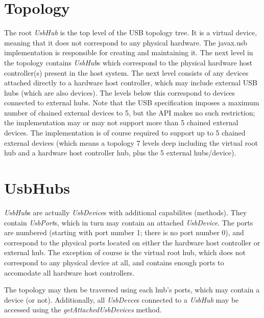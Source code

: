 \documentclass{article}
\newcommand{\myinterface}[1]{\emph{#1}}
\newcommand{\mymethod}[1]{\emph{#1}}
\newcommand{\mysectionend}[0]{\vfill\pagebreak[1]}
\begin{document}
\mysectionend

%

\section{Topology}

The root \myinterface{UsbHub} is the top level of the USB topology tree.  It is a
virtual device, meaning that it does not correspond to any physical hardware.
The javax.usb implementation is responsible for creating and maintaining it.
The next level in the topology contains \myinterface{UsbHub}s which correspond to the
physical hardware host controller(s) present in the host system.  The next
level consists of any devices attached directly to a hardware host controller,
which may include external USB hubs (which are also devices).  The levels below
this correspond to devices connected to external hubs.  Note that the USB
specification imposes a maximum number of chained external devices to 5,
but the API makes no such restriction; the implementation may or may not
support more than 5 chained external devices.  The implementation is of course
required to support up to 5 chained external devices (which means a topology
7 levels deep including the virtual root hub and a hardware host controller hub,
plus the 5 external hubs/device).

\mysectionend

%

\section{UsbHubs}

\myinterface{UsbHub}s are actually \myinterface{UsbDevice}s with additional capabilites (methods).
They contain \myinterface{UsbPort}s, which in turn may contain an attached \myinterface{UsbDevice}.
The ports are numbered (starting with port number 1; there is no port number 0), and
correspond to the physical ports located on either the hardware host controller or external hub.
The exception of course is the virtual root hub, which does not correspond to any physical device
at all, and contains enough ports to accomodate all hardware host controllers.

The topology may then be traversed using each hub's ports, which may contain a device (or not).
Additionally, all \myinterface{UsbDevce}s connected to a \myinterface{UsbHub} may be accessed using
the \mymethod{getAttachedUsbDevices} method.
\end{document}
